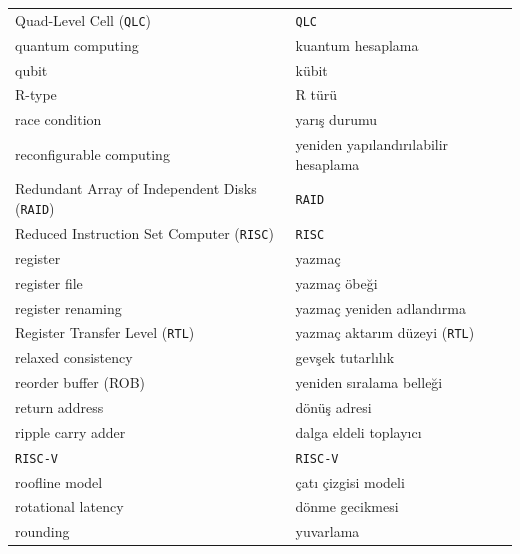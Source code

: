 {\begin{longtable}{@{}p{7.6cm}p{7.6cm}@{}}
Quad-Level Cell (\texttt{QLC}) & \texttt{QLC} \\
quantum computing & kuantum hesaplama \\
qubit & kübit \\

R-type & R türü \\
race condition & yarış durumu \\
reconfigurable computing & yeniden yapılandırılabilir hesaplama \\
Redundant Array of Independent Disks (\texttt{RAID}) & \texttt{RAID} \\
Reduced Instruction Set Computer (\texttt{RISC}) & \texttt{RISC} \\
register & yazmaç \\
register file & yazmaç öbeği \\
register renaming & yazmaç yeniden adlandırma \\
Register Transfer Level (\texttt{RTL}) & yazmaç aktarım düzeyi (\texttt{RTL}) \\
relaxed consistency & gevşek tutarlılık \\
reorder buffer (ROB) & yeniden sıralama belleği \\
return address & dönüş adresi \\
ripple carry adder & dalga eldeli toplayıcı \\
\texttt{RISC-V} & \texttt{RISC-V} \\
roofline model & çatı çizgisi modeli \\
rotational latency & dönme gecikmesi \\
rounding & yuvarlama \\


\end{longtable}}
